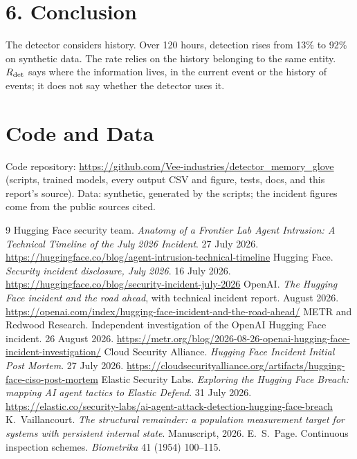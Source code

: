 \documentclass[11pt,letterpaper]{article}
\begin{document}
\section*{6. Conclusion}
The detector considers history. Over 120 hours, detection rises from 13\% to 92\% on synthetic data. The rate relies on the history belonging to the same entity. $R_{\rm det}$ says where the information lives, in the current event or the history of events; it does not say whether the detector uses it.

\section*{Code and Data}
Code repository: \url{https://github.com/Vee-industries/detector_memory_glove} (scripts, trained models, every output CSV and figure, tests, docs, and this report's source). Data: synthetic, generated by the scripts; the incident figures come from the public sources cited.

\begin{thebibliography}{9}\small
{} Hugging Face security team. \emph{Anatomy of a Frontier Lab Agent Intrusion: A Technical Timeline of the July 2026 Incident}. 27 July 2026. \url{https://huggingface.co/blog/agent-intrusion-technical-timeline}
 Hugging Face. \emph{Security incident disclosure, July 2026}. 16 July 2026. \url{https://huggingface.co/blog/security-incident-july-2026}
 OpenAI. \emph{The Hugging Face incident and the road ahead}, with technical incident report. August 2026. \url{https://openai.com/index/hugging-face-incident-and-the-road-ahead/}
 METR and Redwood Research. Independent investigation of the OpenAI Hugging Face incident. 26 August 2026. \url{https://metr.org/blog/2026-08-26-openai-hugging-face-incident-investigation/}
 Cloud Security Alliance. \emph{Hugging Face Incident Initial Post Mortem}. 27 July 2026. \url{https://cloudsecurityalliance.org/artifacts/hugging-face-ciso-post-mortem}
 Elastic Security Labs. \emph{Exploring the Hugging Face Breach: mapping AI agent tactics to Elastic Defend}. 31 July 2026. \url{https://elastic.co/security-labs/ai-agent-attack-detection-hugging-face-breach}
 K.~Vaillancourt. \emph{The structural remainder: a population measurement target for systems with persistent internal state}. Manuscript, 2026.
 E.~S.~Page. Continuous inspection schemes. \emph{Biometrika} 41 (1954) 100--115.
\end{thebibliography}
\end{document}

